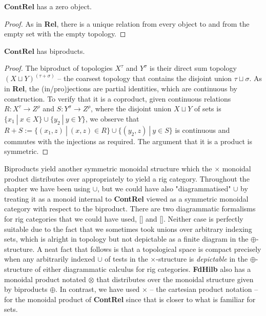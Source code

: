 \begin{fullwidth}
\begin{proposition}
$\mathbf{ContRel}$ has a zero object.
\begin{proof}
As in \textbf{Rel}, there is a unique relation from every object to and from the empty set with the empty topology.
\end{proof}
\end{proposition}

\begin{proposition}
$\mathbf{ContRel}$ has biproducts.
\begin{proof}
The biproduct of topologies $X^\tau$ and $Y^\sigma$ is their direct sum topology $(X \sqcup Y)^{(\tau + \sigma)}$ -- the coarsest topology that contains the disjoint union $\tau \sqcup \sigma$. As in \textbf{Rel}, the (in/pro)jections are partial identities, which are continuous by construction. To verify that it is a coproduct, given continuous relations $R: X^\tau \rightarrow Z^\rho$ and $S: Y^\sigma \rightarrow Z^\rho$, where the disjoint union $X \sqcup Y$ of sets is $\{x_1 \ | \ x \in X\} \cup \{y_2 \ | \ y \in Y\}$, we observe that $R + S := \{ (x_1,z) \ | \ (x,z) \in R \} \cup \{ (y_2,z) \ | \ y \in S \}$ is continuous and commutes with the injections as required. The argument that it is a product is symmetric.
\end{proof}
\end{proposition}

\begin{remark}
Biproducts yield another symmetric monoidal structure which the $\times$ monoidal product distributes over appropriately to yield a rig category. Throughout the chapter we have been using $\cup$, but we could have also "diagrammatised" $\cup$ by treating it as a monoid internal to \textbf{ContRel} viewed as a symmetric monoidal category with respect to the biproduct. There are two diagrammatic formalisms for rig categories that we could have used, [] and []. Neither case is perfectly suitable due to the fact that we sometimes took unions over arbitrary indexing sets, which is alright in topology but not depictable as a finite diagram in the $\oplus$-structure. A neat fact that follows is that a topological space is compact precisely when any arbitrarily indexed $\cup$ of tests in the $\times$-structure is \emph{depictable} in the $\oplus$-structure of either diagrammatic calculus for rig categories. \textbf{FdHilb} also has a monoidal product notated $\otimes$ that distributes over the monoidal structure given by biproducts $\oplus$. In contrast, we have used $\times$ -- the cartesian product notation -- for the monoidal product of \textbf{ContRel} since that is closer to what is familiar for sets.
\end{remark}


\end{fullwidth}
